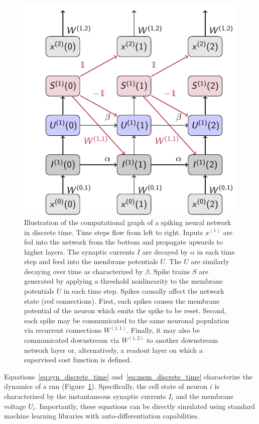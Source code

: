 \documentclass[journal,onecolumn,11pt]{IEEEtran}
\begin{document}
\begin{figure}
    \centering
    \includegraphics{figures/snn_graph.pdf}
	\caption{Illustration of the computational graph of a spiking neural network
  in discrete time. Time steps flow from left to right. Inputs $x^{(1)}$ are fed
	into the network from the bottom and propagate upwards to higher layers. The
	synaptic currents $I$ are decayed by $\alpha$ in each time step and feed
	into the membrane potentials $U$. The $U$ are similarly decaying over time
	as characterized by $\beta$. Spike trains $S$ are generated by applying a
	threshold nonlinearity to the membrane potentials $U$ in each time step.
	Spikes causally affect the network state (red connections).  First, each
	spikes causes the membrane potential of the neuron which emits the spike to
	be reset. Second, each spike may be communicated to the same neuronal
	population via recurrent connections $W^{(1,1)}$.  Finally, it may also be
	communicated downstream via $W^{(1,2)}$ to another downstream network layer
	or, alternatively, a readout layer on which a supervised cost function is
	defined.}
    \label{fig:snn_computational_graph}
\end{figure}

Equations~\eqref{eq:syn_discrete_time} and~\eqref{eq:mem_discrete_time}
characterize the dynamics of a \gls{rnn}
(Figure~\ref{fig:snn_computational_graph}).  Specifically, the cell state of
neuron $i$ is characterized by the instantaneous synaptic currents $I_i$ and the
membrane voltage $U_i$.  Importantly, these equations can be directly simulated
using standard machine learning libraries with auto-differentiation
capabilities.
\end{document}
